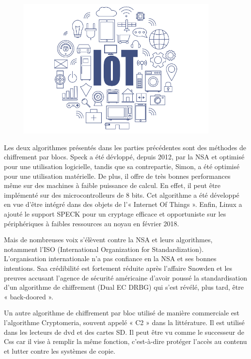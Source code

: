 	\begin{figure}[!h]
		\centering
		\includegraphics[width=0.9\textwidth]{imgs/application/IOT.jpg}
		\label{IOT}
	\end{figure}

	Les deux algorithmes présentés dans les parties précédentes sont des méthodes de chiffrement par blocs.
	Speck a été dévloppé, depuis 2012, par la NSA et optimisé pour une utilisation logicielle, tandis que sa contrepartie, Simon, a été optimisé pour une utilisation matérielle.
	De plus, il offre de très bonnes performances même sur des machines à faible puissance de calcul.
	En effet, il peut être implémenté sur des microcontrolleurs de 8 bits.
	Cet algorithme a été développé en vue d'être intégré dans des objets de l'« Internet Of Things ».
	Enfin, Linux a ajouté le support SPECK pour un cryptage efficace et opportuniste sur les périphériques à faibles ressources au noyau en février 2018.

	Mais de nombreuses voix s'élèvent contre la NSA et leurs algorithmes, notamment l'ISO (International Organization for Standardization).
	L'organisation internationale n'a pas confiance en la NSA et ses bonnes intentions.
	Saa crédibilité est fortement réduite après l'affaire Snowden et les preuves accusant l'agence de sécurité américaine d'avoir poussé la standardisation d'un algorithme de chiffrement (Dual EC DRBG) qui s'est révélé, plus tard, être « back-doored »\cite{NSABackdoor}.

	Un autre algorithme de chiffrement par bloc utilisé de manière commerciale est l'algorithme Cryptomeria, souvent appelé « C2 » dans la littérature.
	Il est utilisé dans les lecteurs de dvd et des cartes SD. Il peut être vu comme le successeur de Css car il vise à remplir la même fonction, c'est-à-dire protéger l'accès au contenu et lutter contre les systèmes de copie.

